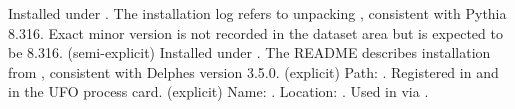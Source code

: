 {}\markdownRendererUlBeginTight
\markdownRendererUlItem Installed under .\markdownRendererUlItemEnd 
\markdownRendererUlItem The installation log refers to unpacking , consistent with Pythia 8.316.\markdownRendererUlItemEnd 
\markdownRendererUlItem Exact minor version is not recorded in the dataset area but is expected to be 8.316.\markdownRendererUlItemEnd 
\markdownRendererUlEndTight \markdownRendererUlItemEnd 
\markdownRendererUlItem {} (semi-explicit)\markdownRendererInterblockSeparator
{}\markdownRendererUlBeginTight
\markdownRendererUlItem Installed under .\markdownRendererUlItemEnd 
\markdownRendererUlItem The README describes installation from , consistent with Delphes version 3.5.0.\markdownRendererUlItemEnd 
\markdownRendererUlEndTight \markdownRendererUlItemEnd 
\markdownRendererUlItem {} (explicit)\markdownRendererInterblockSeparator
{}\markdownRendererUlBeginTight
\markdownRendererUlItem Path: .\markdownRendererUlItemEnd 
\markdownRendererUlItem Registered in  and in the UFO process card.\markdownRendererUlItemEnd 
\markdownRendererUlEndTight \markdownRendererUlItemEnd 
\markdownRendererUlItem {} (explicit)\markdownRendererInterblockSeparator
{}\markdownRendererUlBeginTight
\markdownRendererUlItem Name: .\markdownRendererUlItemEnd 
\markdownRendererUlItem Location: .\markdownRendererUlItemEnd 
\markdownRendererUlItem Used in  via .\markdownRendererUlItemEnd 
\markdownRendererUlEndTight \markdownRendererUlItemEnd 
